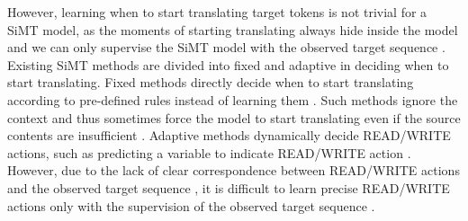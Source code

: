 \documentclass{article} %
\begin{document}
However, learning when to start translating target tokens is not trivial for a SiMT model, as the moments of starting translating always hide inside the model and we can only supervise the SiMT model with the observed target sequence \citep{dualpath}. Existing SiMT methods are divided into fixed and adaptive in deciding when to start translating. Fixed methods directly decide when to start translating according to pre-defined rules instead of learning them \citep{dalvi-etal-2018-incremental,ma-etal-2019-stacl,multipath}. Such methods ignore the context and thus sometimes force the model to start translating even if the source contents are insufficient \citep{zheng-etal-2020-simultaneous}. Adaptive methods dynamically decide READ/WRITE actions, such as predicting a variable to indicate READ/WRITE action \citep{Arivazhagan2019,Ma2019a,miao-etal-2021-generative}. However, due to the lack of clear correspondence between READ/WRITE actions and the observed target sequence \citep{zhang-feng-2022-gaussian}, it is difficult to learn precise READ/WRITE actions only with the supervision of the observed target sequence \citep{alinejad-etal-2021-translation,dualpath,indurthi-etal-2022-language}.
\end{document}
